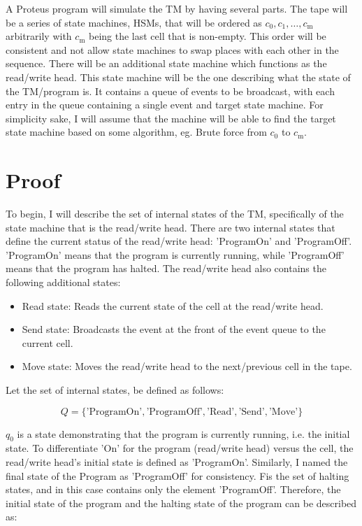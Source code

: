 A Proteus program will simulate the TM by having several parts.
The tape will be a series of state machines, HSMs, that will be ordered as $c_{0}, c_{1}, \dots , c_{\text{m}}$ arbitrarily with $c_{\text{m}}$ being the last cell that is non-empty.
This order will be consistent and not allow state machines to swap places with each other in the sequence.
There will be an additional state machine which functions as the read/write head.
This state machine will be the one describing what the state of the TM/program is.
It contains a queue of events to be broadcast, with each entry in the queue containing a single event and target state machine.
For simplicity sake, I will assume that the machine will be able to find the target state machine based on some algorithm, eg. Brute force from $c_{0}$ to $c_{\text{m}}$.

\section{Proof}\label{sec:Proof}

To begin, I will describe the set of internal states of the TM, specifically of the state machine that is the read/write head.
There are two internal states that define the current status of the read/write head: 'ProgramOn' and 'ProgramOff'.
'ProgramOn' means that the program is currently running, while 'ProgramOff' means that the program has halted.
The read/write head also contains the following additional states:
\begin{itemize}
    \item Read state: Reads the current state of the cell at the read/write head.
    \item Send state: Broadcasts the event at the front of the event queue to the current cell.
    \item Move state: Moves the read/write head to the next/previous cell in the tape.
\end{itemize}
Let the set of internal states, be defined as follows:

\[
Q = \{\text{'ProgramOn'}, \text{'ProgramOff'}, \text{'Read'}, \text{'Send'}, \text{'Move'}\}
\]

$q_{0}$ is a state demonstrating that the program is currently running, i.e. the initial state.
To differentiate 'On' for the program (read/write head) versus the cell, the read/write head's initial state is defined as 'ProgramOn'.
Similarly, I named the final state of the Program as 'ProgramOff' for consistency.
Fis the set of halting states, and in this case contains only the element 'ProgramOff'.
Therefore, the initial state of the program and the halting state of the program can be described as:

